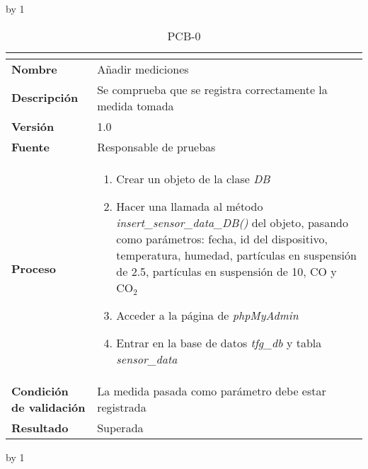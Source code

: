 \advance\pcb by 1
\begin{table}[H]
	\caption{PCB-0\number\pcb}
	\begin{tabular}{|l|p{}|}
		\hline
		\multicolumn{2}{|c|}{\cellcolor[HTML]{BFBFBF}{\color[HTML]{000000} \textbf{PCB-0\number\pcb}}} \\ \hline
		\textbf{Nombre}                  & Añadir mediciones                                           \\ \hline
		\textbf{Descripción}             & Se comprueba que se registra correctamente la medida tomada \\ \hline
		\textbf{Versión}                 & 1.0                                                         \\ \hline
		\textbf{Fuente}                  & Responsable de pruebas                                      \\ \hline
		\textbf{Proceso}                 & \begin{enumerate}
			\item Crear un objeto de la clase \textit{DB}
			\item Hacer una llamada al método \textit{insert\_sensor\_data\_DB()} del objeto, pasando como parámetros: fecha, id del dispositivo, temperatura, humedad, partículas en suspensión de 2.5, partículas en suspensión de 10, CO y CO$_2$
			\item Acceder a la página de \textit{phpMyAdmin}
			\item Entrar en la base de datos \textit{tfg\_db} y tabla \textit{sensor\_data}
		\end{enumerate}                                  \\ \hline
		\textbf{Condición de validación} & La medida pasada como parámetro debe estar registrada       \\ \hline
		\textbf{Resultado}               & Superada                                                    \\ \hline
	\end{tabular}
\end{table}
\advance\pcb by 1
